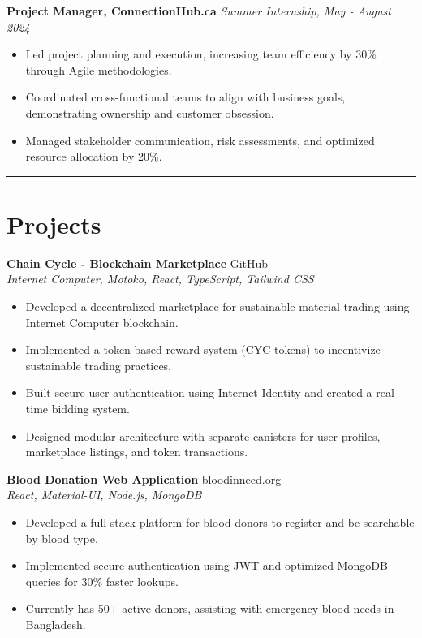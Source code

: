 \documentclass[a4paper,10pt]{article}
\begin{document}
\textbf{Project Manager, ConnectionHub.ca} \hfill \textit{Summer Internship, May - August 2024}
\begin{itemize}[leftmargin=*]
    \item Led project planning and execution, increasing team efficiency by 30\% through Agile methodologies.
    \item Coordinated cross-functional teams to align with business goals, demonstrating ownership and customer obsession.
    \item Managed stakeholder communication, risk assessments, and optimized resource allocation by 20\%.
\end{itemize}

\vspace{6pt}
\hrule \vspace{6pt}

\section*{Projects}

\textbf{Chain Cycle - Blockchain Marketplace} \hfill \href{https://github.com/znafi/Chain-Cycle}{GitHub} \\
\textit{Internet Computer, Motoko, React, TypeScript, Tailwind CSS}
\begin{itemize}[leftmargin=*]
    \item Developed a decentralized marketplace for sustainable material trading using Internet Computer blockchain.
    \item Implemented a token-based reward system (CYC tokens) to incentivize sustainable trading practices.
    \item Built secure user authentication using Internet Identity and created a real-time bidding system.
    \item Designed modular architecture with separate canisters for user profiles, marketplace listings, and token transactions.
\end{itemize}

\textbf{Blood Donation Web Application} \hfill \href{https://bloodinneed.org/}{bloodinneed.org} \\
\textit{React, Material-UI, Node.js, MongoDB}
\begin{itemize}[leftmargin=*]
    \item Developed a full-stack platform for blood donors to register and be searchable by blood type.
    \item Implemented secure authentication using JWT and optimized MongoDB queries for 30\% faster lookups.
    \item Currently has 50+ active donors, assisting with emergency blood needs in Bangladesh.
\end{itemize}
\end{document}
